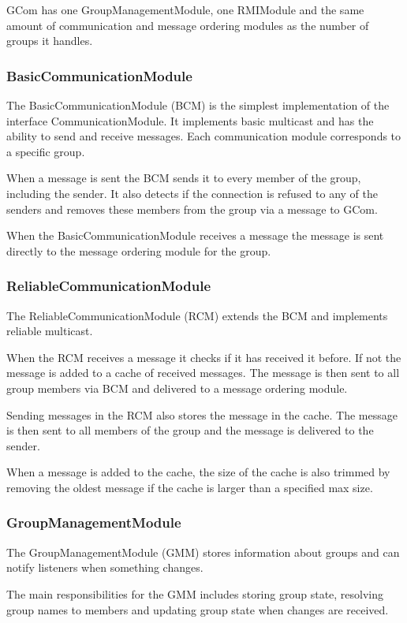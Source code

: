 \documentclass[a4paper,english]{article}
\begin{document}
GCom has one GroupManagementModule, one RMIModule and the same amount of communication and message ordering modules as the number of groups it handles.

\subsubsection{BasicCommunicationModule}
The BasicCommunicationModule (BCM) is the simplest implementation of the interface CommunicationModule. It implements basic multicast and has the ability to send and receive messages. Each communication module corresponds to a specific group. 

When a message is sent the BCM sends it to every member of the group, including the sender. It also detects if the connection is refused to any of the senders and removes these members from the group via a message to GCom.

When the BasicCommunicationModule receives a message the message is sent directly to the message ordering module for the group.

\subsubsection{ReliableCommunicationModule}
The ReliableCommunicationModule (RCM) extends the BCM and implements reliable multicast.

When the RCM receives a message it checks if it has received it before. If not the message is added to a cache of received messages. The message is then sent to all group members via BCM and delivered to a message ordering module.

Sending messages in the RCM also stores the message in the cache. The message is then sent to all members of the group and the message is delivered to the sender.

When a message is added to the cache, the size of the cache is also trimmed by removing the oldest message if the cache is larger than a specified max size.

\subsubsection{GroupManagementModule}
The GroupManagementModule (GMM) stores information about groups and can notify listeners when something changes.

The main responsibilities for the GMM includes storing group state, resolving group names to members and updating group state when changes are received.
\end{document}
